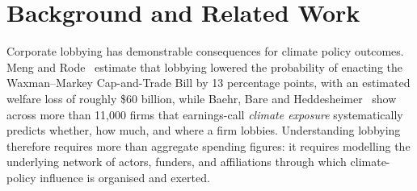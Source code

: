\vspace{-0.3cm}\section{Background and Related Work}\vspace{-0.3cm}
\label{sec:related}
Corporate lobbying has demonstrable consequences for climate policy outcomes.
Meng and Rode~\cite{meng2019social} estimate that lobbying lowered the probability of enacting the Waxman--Markey Cap-and-Trade Bill by 13 percentage points, with an estimated welfare loss of roughly \$60 billion, while Baehr, Bare and Heddesheimer~\cite{baehr2026climate} show across more than 11{,}000 firms that earnings-call \emph{climate exposure} systematically predicts whether, how much, and where a firm lobbies.
Understanding lobbying therefore requires more than aggregate spending figures: it requires modelling the underlying network of actors, funders, and affiliations through which climate-policy influence is organised and exerted.

